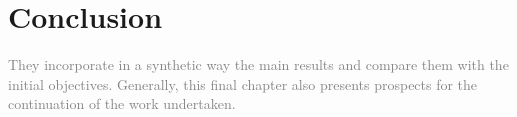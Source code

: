 \chapter{Conclusion}
\label{Chap6}
\textcolor{gray}{They incorporate in a synthetic way the main results and compare them with the
initial objectives. Generally, this final chapter also presents prospects for the continuation of the
work undertaken.}